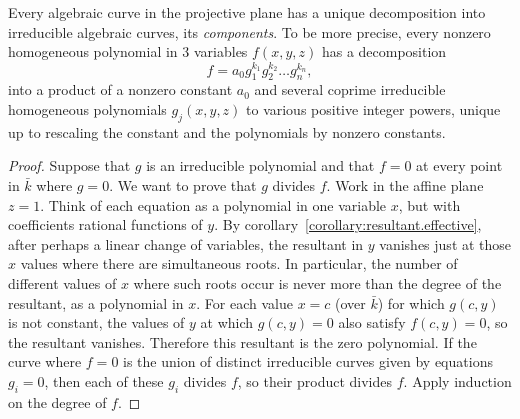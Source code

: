 \begin{theorem}[Study]\label{theorem:Study}
Every algebraic curve in the projective plane has a unique decomposition into irreducible algebraic curves, its \emph{components}.
To be more precise, every nonzero homogeneous polynomial in 3 variables \(f(x,y,z)\) has a decomposition
\[
f=a_0 g_1^{k_1} g_2^{k_2} \dots g_n^{k_n},
\]
into a product of a nonzero constant \(a_0\) and several coprime irreducible homogeneous polynomials \(g_j(x,y,z)\) to various positive integer powers, unique up to rescaling the constant and the polynomials by nonzero constants.
\end{theorem}
\begin{proof}
Suppose that \(g\) is an irreducible polynomial and that \(f=0\) at every point in \(\bar{k}\) where \(g=0\). 
We want to prove that \(g\) divides \(f\).
Work in the affine plane \(z=1\).
Think of each equation as a polynomial in one variable \(x\), but with coefficients rational functions of \(y\).
By corollary~\vref{corollary:resultant.effective}, after perhaps a linear change of variables, the resultant in \(y\) vanishes just at those \(x\) values where there are simultaneous roots.
In particular, the number of different values of \(x\) where such roots occur is never more than the degree of the resultant, as a polynomial in \(x\).
For each value \(x=c\) (over \(\bar{k}\)) for which \(g(c,y)\) is not constant, the values of \(y\) at which \(g(c,y)=0\) also satisfy \(f(c,y)=0\), so the resultant vanishes.
Therefore this resultant is the zero polynomial.
If the curve where \(f=0\) is the union of distinct irreducible curves given by equations \(g_i=0\), then each of these \(g_i\) divides \(f\), so their product divides \(f\).
Apply induction on the degree of \(f\).
\end{proof}

